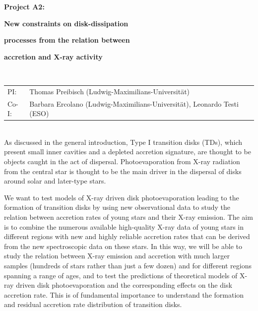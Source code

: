 \documentclass[10pt,fleqn,twoside]{article}
\begin{document}
\newpage


\setcounter{page}{1}

\centerline{\huge\bf\Tcol
%
%
%
%
%
 Project A2:}
\vspace{1em}

\centerline{\LARGE\bf\Tcol New constraints on disk-dissipation}\vspace{0.3em}
\centerline{\LARGE\bf\Tcol processes from the relation between}\vspace{0.3em}
\centerline{\LARGE\bf\Tcol  accretion and  X-ray activity}

%
%
%
%
%
\vskip1.0cm


\\
\begin{tabular}{ll}
{\textsf{PI:}}                   & Thomas Preibisch (Ludwig-Maximilians-Universit\"at) \\
{\textsf{Co-I:}}                & Barbara Ercolano (Ludwig-Maximilians-Universit\"at), Leonardo Testi (ESO)\\
\end{tabular}


\vspace{1em}

\vspace{1em}
\\
As discussed in the general introduction, Type I transition disks
(TDs), which present small inner cavities and a depleted accretion
signature, are thought to be objects caught in the act of
dispersal. Photoevaporation from X-ray radiation from the central
star is thought to be the main driver in the dispersal of disks around
solar and later-type stars. 

We want to test models of X-ray driven disk photoevaporation leading
to the formation of transition disks by using
new observational data to study the relation between accretion rates of young stars and
their X-ray emission.
The aim is to combine the numerous available high-quality
X-ray data of young stars  in different regions with new and highly reliable 
accretion rates that can be derived from the new spectroscopic data on these stars.
In this way, we will be able to study the relation between X-ray emission
and accretion with much larger samples (hundreds of stars rather
than just a few dozen) and for different regions spanning a range
of ages, and to test the predictions of theoretical models of
X-ray driven disk photoevaporation and the corresponding effects on
the disk accretion rate. This is of fundamental importance to
understand the formation and residual accretion rate distribution of
transition disks. 
\end{document}
